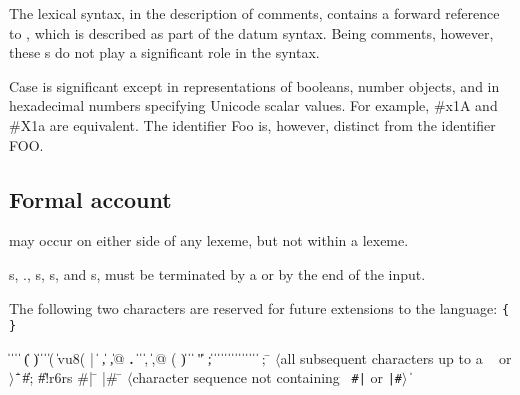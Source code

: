 The lexical syntax, in the description of comments, contains
a forward reference to , which is described as part of the
datum syntax.  Being comments, however, these s do not play
a significant role in the syntax.

Case is significant except in representations of booleans, number objects, and
in hexadecimal numbers specifying Unicode scalar values.  For example, {\cf \#x1A}
and {\cf \#X1a} are equivalent.  The identifier {\cf Foo} is, however,
distinct from the identifier {\cf FOO}.

\subsection{Formal account}
\label{lexicalgrammarsection}

 may occur on either side of any lexeme, but not
within a lexeme.

s, {\cf .}, s, s, and
s, must be terminated by a  or by the
end of the input.

The following two characters are reserved for future extensions to the
language: {\tt \verb"{" \verb"}"}

\begin{grammar}%
 \:  \|  \| 
\>  \|  \| 
\>  \| ( \| ) \| \openbracket{} \| \closedbracket{} \| \sharpsign( \| \sharpsign{}vu8( | \singlequote{} \| \backquote{} \| , \| ,@ \| {\bf.}
\>  \| \sharpsign\singlequote{} \| \sharpsign\backquote{} \| \sharpsign, \| \sharpsign,@
 \: ( \| ) \| \openbracket{} \| \closedbracket{} \| " \| ; \| \sharpsign{}
\>  \| 
 \: 
\> \|  \|  \| 
\> \|  \| 
\> \| 
 \:  \| 
\> \|   \| 
\> \|   \| 
 \: ; \= $\langle$\rm all subsequent characters up to a
                    \>\ \rm {} or $\rangle$
\qquad \= \| 
\> \| \#;  
\> \| \#!r6rs
 \: \#| \= 
\>  |\#
 \: \= $\langle$\rm character sequence not containing
\>\ \rm {\tt \#|} or {\tt |\#}$\rangle$
 \:  
 \:  \| 
 \: %
\end{grammar}

